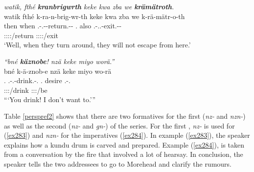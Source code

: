 \begin{exe}
	\ex \emph{watik, fthé \textbf{kranbrigwrth} keke kwa zba we\hspace*{2cm} \textbf{krämätroth}.}\\
	\glll watik fthé k-ra-n-brig-wr-th keke kwa zba we k-rä-mätr-o-th\\
	then when \M.\Bet-\Irr.\Vc-\Venit-return.\Ext-\Ndu-\Stnsg{} \Neg{} \Fut{} \Prox.\Abl{} also \M.\Bet-\Irr.\Vc.\Ndu-exit.\Rs-\Andat-\Stnsg{}\\
	{} {} \footnotesize{\Stpl:\Sbj:\Irr:\Ipfv:\Venit/return} {} {} {} {} \footnotesize{\Stpl:\Sbj:\Irr:\Pfv:\Andat/exit}\\
	\trans `Well, when they turn around, they will not escape from here.'\\ 
	\label{ex330}
\end{exe}
\begin{exe}
	\ex \emph{``bné \textbf{käznobe}! nzä keke miyo worä.''}\\
	\glll bné k-ä-znob-e nzä keke miyo wo-rä\\
	\Snsg.\Erg{} \M.\Bet-\Ndu.\Vc-drink.\Rs-\Snsg.\Imp{} \Fsg.\Abs{} \Neg{} desire \Fsg.\Alph-\Cop.\Ndu\\
	{} \footnotesize{\Spl:\Sbj:\Imp:\Pfv/drink} {} {} {} \footnotesize{\Fsg:\Sbj:\Nonpast:\Ipfv/be}\\
	\trans ```You drink! I don't want to.''' 
	\label{ex278}
\end{exe}

Table \ref{perspref2} shows that there are two formatives for the first  (\emph{nz-} and \emph{nzn-}) as well as the second  (\emph{nz-} and \emph{gn-}) of the \Bet{} series. For the first  , \emph{nz-} is used for  (\ref{ex283}) and \emph{nzn-} for the imperatives (\ref{ex284}). In example (\ref{ex283}), the speaker explains how a kundu drum is carved and prepared. Example (\ref{ex284}), is taken from a conversation by the fire that involved a lot of hearsay. In conclusion, the speaker tells the two addressees to go to Morehead and clarify the rumours.

